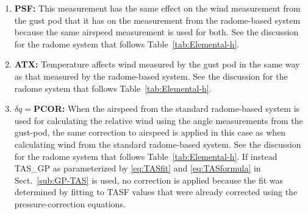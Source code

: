 \documentclass[12pt,twoside,english]{article}\usepackage[]{graphicx}\usepackage[]{color}
\let\OrgIndex\index
\renewcommand*{\index}[1]{\OrgIndex{#1}}
\begin{document}
{{\begin{enumerate}
The measurement of horizontal wind is the sum of the relative wind and the horizontal motion of the aircraft relative to the Earth, so uncertainty in this component enters directly into uncertainty in the measured wind components. Comparison among the different measurements of velocity components of the aircraft (\{GGVEW, CVEW\_GP, CVEW\_LAMS\} and \{GGVNS, CVNS\_GP, CVNS\_LAMS\}) indicate that, for DEEPWAVE flights with good IRU operation (flights 5, 8--14, 16, 20--21, 23--24, 26) the standard deviations among these measurements are consistent with an uncertainty of 0.05\,m/s. This characterizes some combination of bias and random error, so to be conservative this value has been assigned to each in the table.  
\item \textbf{PSF:} 
This measurement has the same effect on the wind measurement from the gust pod that it has on the measurement from the radome-based system because the same airspeed measurement is used for both. See the discussion for the radome system that follows Table~\ref{tab:Elemental-h}.  
\item \textbf{ATX:}
Temperature affects wind measured by the gust pod in the same way as that measured by the radome-based system. See the discussion for the radome system that follows Table~\ref{tab:Elemental-h}.  
\item \textbf{$\delta q=$PCOR:} 
When the airspeed from
the standard radome-based system is used for calculating the relative
wind using the angle measurements from the gust-pod, the same correction
to airspeed is applied in this case as when calculating wind
from the standard radome-based system. See the discussion for the
radome system that follows Table~\ref{tab:Elemental-h}. If instead
TAS\_GP as parameterized by \eqref{eq:TASfit} and \eqref{eq:TASformula} in Sect.~\ref{sub:GP-TAS} is used, no correction is applied because the
fit was determined by fitting to TASF values that were already corrected
using the pressure-correction equations.
\end{enumerate}

}}
\end{document}
